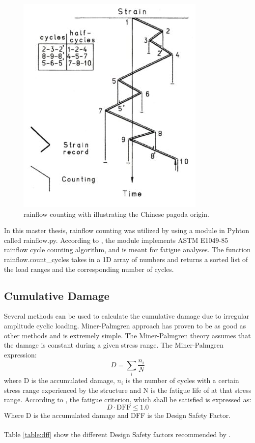 \begin{figure}[H]
\centering
\includegraphics[scale=0.9]{figures/pagoda}
\caption[$\; \:$rainflow counting]{rainflow counting with illustrating the Chinese pagoda origin.    \cite{fatigue2016} }
 \label{fig:pagoda}
\end{figure}
\noindent In this master thesis, rainflow counting was utilized by using a module in Pyhton called rainflow.py. According to \cite{rf}, the module implements ASTM E1049-85 rainflow cycle counting
algorithm, and is meant for fatigue analyses. The function rainflow.count\_cycles takes in a 1D array of numbers and returns a sorted list of the load ranges and the corresponding
number of cycles.

\subsection{Cumulative Damage}
Several methods can be used to calculate the cumulative damage due to irregular amplitude cyclic loading. Miner-Palmgren approach has proven to be as good as other methods and is extremely simple. The Miner-Palmgren theory assumes that the damage is constant during a given stress range. The Miner-Palmgren expression:
\begin{equation}
    D=\sum_i \frac{n_i}{N} 
    \label{eq:MP}
\end{equation}
where D is the accumulated damage, $n_i$ is the number of cycles with a certain stress range experienced by the structure and N is the fatigue life of at that stress range.\newline
\newline
According to \cite{riserfat}, the fatigue criterion, which shall be satisfied is expressed as:
\begin{equation}
    D \cdot \text{DFF} \leq 1.0
\end{equation}
Where D is the accumulated damage and DFF is the Design Safety Factor.\\\\ Table \ref{table:dff} show the different Design Safety factors recommended by \cite{riserfat}. 

